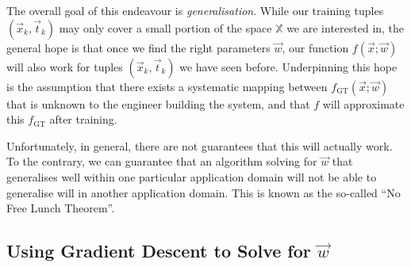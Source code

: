 \documentclass[10pt,letterpaper,oneside]{article}
\begin{document}
The overall goal of this endeavour is \emph{generalisation}. While our training tuples $(\vec x_k, \vec t_k)$ may only cover a small portion of the space $\mathbb{X}$ we are interested in, the general hope is that once we find the right parameters $\vec w$, our function $f(\vec x; \vec w)$ will also work for tuples $(\vec x_k, \vec t_k)$ we have seen before. Underpinning this hope is the assumption that there exists a systematic mapping between $f_{\mathrm{GT}}(\vec x; \vec w)$ that is unknown to the engineer building the system, and that $f$ will approximate this $f_{\mathrm{GT}}$ after training.

Unfortunately, in general, there are not guarantees that this will actually work. To the contrary, we can guarantee that an algorithm solving for $\vec w$ that generalises well within one particular application domain will not be able to generalise will in another application domain. This is known as the so-called \enquote{No Free Lunch Theorem}.


\subsection{Using Gradient Descent to Solve for $\vec w$}
\end{document}
